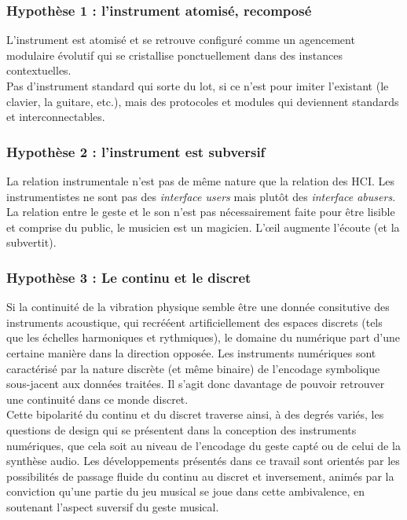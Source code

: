 \subsubsection*{Hypothèse 1 : l'instrument atomisé, recomposé}

L'instrument est atomisé et se retrouve configuré comme un agencement modulaire évolutif qui se cristallise ponctuellement dans des instances contextuelles. \\
Pas d'instrument standard qui sorte du lot, si ce n'est pour imiter l'existant (le clavier, la guitare, etc.), mais des protocoles et modules qui deviennent standards et interconnectables.

\subsubsection*{Hypothèse 2 : l'instrument est subversif}


La relation instrumentale n'est pas de même nature que la relation des HCI.
Les instrumentistes ne sont pas des \textit{interface users} mais plutôt des \textit{interface abusers}.
La relation entre le geste et le son n'est pas nécessairement faite pour être lisible et comprise du public, le musicien est un magicien.
L'œil augmente l'écoute (et la subvertit).


\subsubsection*{Hypothèse 3 : Le continu et le discret}

Si la continuité de la vibration physique semble être une donnée consitutive des instruments acoustique, qui recrééent artificiellement des espaces discrets (tels que les échelles harmoniques et rythmiques), le domaine du numérique part d'une certaine manière dans la direction opposée. Les instruments numériques sont caractérisé par la nature discrète (et même binaire) de l'encodage symbolique sous-jacent aux données traitées. Il s'agit donc davantage de pouvoir retrouver une continuité dans ce monde discret.\\
Cette bipolarité du continu et du discret traverse ainsi, à des degrés variés, les questions de design qui se présentent dans la conception des instruments numériques, que cela soit au niveau de l'encodage du geste capté ou de celui de la synthèse audio. Les développements présentés dans ce travail sont orientés par les possibilités de passage fluide du continu au discret et inversement, animés par la conviction qu'une partie du jeu musical se joue dans cette ambivalence, en soutenant l'aspect suversif du geste musical.


